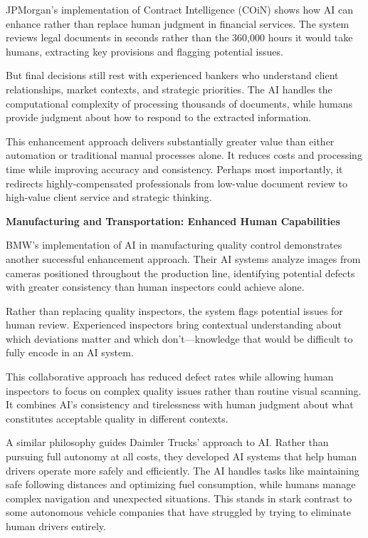 \documentclass[
  Letterpaper,
]{scrbook}
\begin{document}
JPMorgan's implementation of Contract Intelligence (COiN) shows how AI
can enhance rather than replace human judgment in financial services.
The system reviews legal documents in seconds rather than the 360,000
hours it would take humans, extracting key provisions and flagging
potential issues.

But final decisions still rest with experienced bankers who understand
client relationships, market contexts, and strategic priorities. The AI
handles the computational complexity of processing thousands of
documents, while humans provide judgment about how to respond to the
extracted information.

This enhancement approach delivers substantially greater value than
either automation or traditional manual processes alone. It reduces
costs and processing time while improving accuracy and consistency.
Perhaps most importantly, it redirects highly-compensated professionals
from low-value document review to high-value client service and
strategic thinking.

\textbf{Manufacturing and Transportation: Enhanced Human Capabilities}

BMW's implementation of AI in manufacturing quality control demonstrates
another successful enhancement approach. Their AI systems analyze images
from cameras positioned throughout the production line, identifying
potential defects with greater consistency than human inspectors could
achieve alone.

Rather than replacing quality inspectors, the system flags potential
issues for human review. Experienced inspectors bring contextual
understanding about which deviations matter and which don't---knowledge
that would be difficult to fully encode in an AI system.

This collaborative approach has reduced defect rates while allowing
human inspectors to focus on complex quality issues rather than routine
visual scanning. It combines AI's consistency and tirelessness with
human judgment about what constitutes acceptable quality in different
contexts.

A similar philosophy guides Daimler Trucks' approach to AI. Rather than
pursuing full autonomy at all costs, they developed AI systems that help
human drivers operate more safely and efficiently. The AI handles tasks
like maintaining safe following distances and optimizing fuel
consumption, while humans manage complex navigation and unexpected
situations. This stands in stark contrast to some autonomous vehicle
companies that have struggled by trying to eliminate human drivers
entirely.
\end{document}
